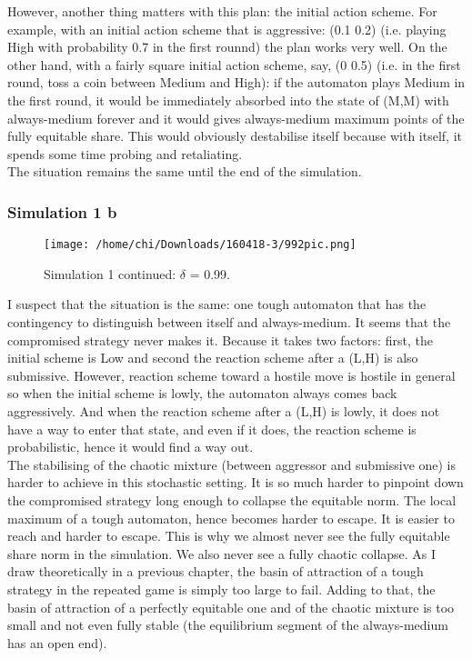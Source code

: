\documentclass[12.5pt]{report}
\begin{document}
However, another thing matters with this plan: the initial action scheme. For example, with an initial action scheme that is aggressive: (0.1 0.2) (i.e. playing High with probability 0.7 in the first rounnd) the plan works very well. On the other hand, with a fairly square initial action scheme, say, (0 0.5) (i.e. in the first round, toss a coin between Medium and High): if the automaton plays Medium in the first round, it would be immediately absorbed into the state of (M,M) with always-medium forever and it would gives always-medium maximum points of the fully equitable share. This would obviously destabilise itself because with itself, it spends some time probing and retaliating.\\

The situation remains the same until the end of the simulation.\\
  
\subsubsection{Simulation 1 b}

\begin{figure}[h!]
\center
\texttt{[image: /home/chi/Downloads/160418-3/992pic.png]}
\caption{Simulation 1 continued: $\delta$ = 0.99.}
\end{figure}  
  
I suspect that the situation is the same: one tough automaton that has the contingency to distinguish between itself and always-medium. It seems that the compromised strategy never makes it. Because it takes two factors: first, the initial scheme is Low and second the reaction scheme after a (L,H) is also submissive. However, reaction scheme toward a hostile move is hostile in general so when the initial scheme is lowly, the automaton always comes back aggressively. And when the reaction scheme after a (L,H) is lowly, it does not have a way to enter that state, and even if it does, the reaction scheme is probabilistic, hence it would find a way out.\\

The stabilising of the chaotic mixture (between aggressor and submissive one) is harder to achieve in this stochastic setting. It is so much harder to pinpoint down the compromised strategy long enough to collapse the equitable norm. The local maximum of a tough automaton, hence becomes harder to escape. It is easier to reach and harder to escape. This is why we almost never see the fully equitable share norm in the simulation. We also never see a fully chaotic collapse. As I draw theoretically in a previous chapter, the basin of attraction of a tough strategy in the repeated game is simply too large to fail. Adding to that, the basin of attraction of a perfectly equitable one and of the chaotic mixture is too small and not even fully stable (the equilibrium segment of the always-medium has an open end).\\
\end{document}
